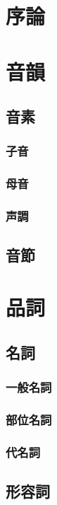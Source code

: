 \section{序論} 
\newpage

\section{音韻}
\subsection{音素}
\subsubsection{子音}
\subsubsection{母音}
\subsubsection{声調}
\subsection{音節}
\newpage

\section{品詞}
\subsection{名詞}
\subsubsection{一般名詞}
\subsubsection{部位名詞}
\subsubsection{代名詞}
\subsection{形容詞}
